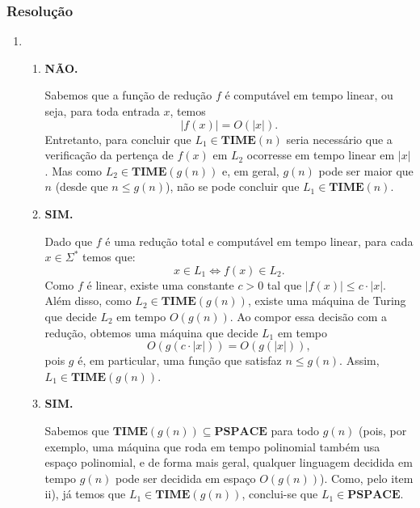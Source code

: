 \documentclass[a4paper,12pt]{article}
\begin{document}
\subsubsection*{Resolução}
\begin{enumerate}[label=\alph*)]
  \item
  \begin{enumerate}[label=\roman*)]
    \item \textbf{NÃO.}
  
    \vspace{0.3cm}
    Sabemos que a função de redução $f$ é computável em tempo linear, ou seja, para toda entrada $x$, temos 
    $$|f(x)| = O(|x|).$$ 
    Entretanto, para concluir que $L_1 \in \textbf{TIME}(n)$ seria necessário que a verificação da pertença de $f(x)$ em $L_2$ ocorresse em tempo linear em $|x|$. Mas como $L_2 \in \textbf{TIME}(g(n))$ e, em geral, $g(n)$ pode ser maior que $n$ (desde que $n \leq g(n)$), não se pode concluir que $L_1 \in \textbf{TIME}(n)$.

    \vspace{0.5cm}
    \item \textbf{SIM.}
    
    \vspace{0.3cm}
    Dado que $f$ é uma redução total e computável em tempo linear, para cada $x \in \Sigma^*$ temos que:
    $$x \in L_1 \iff f(x) \in L_2.$$ 
    Como $f$ é linear, existe uma constante $c > 0$ tal que $|f(x)| \leq c \cdot |x|$. 
    Além disso, como $L_2 \in \textbf{TIME}(g(n))$, existe uma máquina de Turing que decide $L_2$ em tempo $O(g(n))$. Ao compor essa decisão com a redução, obtemos uma máquina que decide $L_1$ em tempo
    $$O(g(c\cdot|x|)) = O(g(|x|)),$$
    pois $g$ é, em particular, uma função que satisfaz $n \leq g(n)$. Assim, $L_1 \in \textbf{TIME}(g(n))$.

    \vspace{0.5cm}
    \item \textbf{SIM.}
    
    \vspace{0.3cm}
    Sabemos que $\textbf{TIME}(g(n)) \subseteq \textbf{PSPACE}$ para todo $g(n)$ (pois, por exemplo, uma máquina que roda em tempo polinomial também usa espaço polinomial, e de forma mais geral, qualquer linguagem decidida em tempo $g(n)$ pode ser decidida em espaço $O(g(n))$).  
    Como, pelo item ii), já temos que $L_1 \in \textbf{TIME}(g(n))$, conclui-se que $L_1 \in \textbf{PSPACE}$.
  \end{enumerate}
\end{enumerate}
\end{document}
